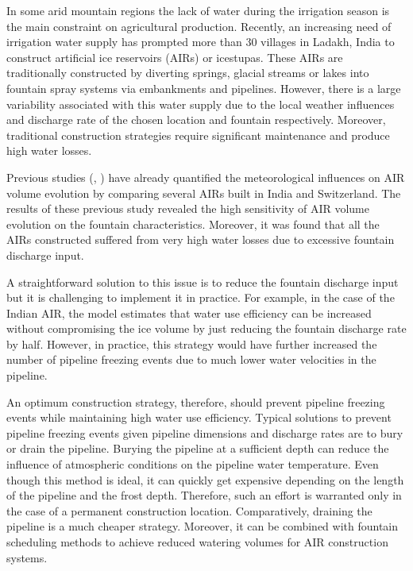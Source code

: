 \documentclass[tc, manuscript]{copernicus}
\begin{document}
\introduction

In some arid mountain regions the lack of water during the irrigation season is the main constraint on
agricultural production. Recently, an increasing need of irrigation water supply has prompted more than 30
villages in Ladakh, India to construct artificial ice reservoirs (AIRs) or icestupas. These AIRs are
traditionally constructed by diverting springs, glacial streams or lakes into fountain spray systems via
embankments and pipelines. However, there is a large variability associated with this water supply due to the
local weather influences and discharge rate of the chosen location and fountain respectively. Moreover,
traditional construction strategies require significant maintenance and produce high water losses.

Previous studies (\citep{balasubramanianInfluenceMeteorologicalConditions2022},
\citep{oerlemansBriefCommunicationGrowth2021}) have already quantified the meteorological influences on AIR
volume evolution by comparing several AIRs built in India and Switzerland. The results of these previous study
revealed the high sensitivity of AIR volume evolution on the fountain characteristics. Moreover, it was found
that all the AIRs constructed suffered from very high water losses due to excessive fountain discharge input. 

A straightforward solution to this issue is to reduce the fountain discharge input but it is challenging to
implement it in practice. For example, in the case of the Indian AIR, the model estimates that water use
efficiency can be increased without compromising the ice volume by just reducing the fountain discharge rate by
half. However, in practice, this strategy would have further increased the number of pipeline freezing events
due to much lower water velocities in the pipeline. 

An optimum construction strategy, therefore, should prevent pipeline freezing events while maintaining high
water use efficiency. Typical solutions to prevent pipeline freezing events given pipeline dimensions and
discharge rates are to bury or drain the pipeline. Burying the pipeline at a sufficient depth can reduce the
influence of atmospheric conditions on the pipeline water temperature. Even though this method is ideal, it can
quickly get expensive depending on the length of the pipeline and the frost depth. Therefore, such an effort is
warranted only in the case of a permanent construction location. Comparatively, draining the pipeline is a much
cheaper strategy. Moreover, it can be combined with fountain scheduling methods to achieve reduced watering
volumes for AIR construction systems.
\end{document}
